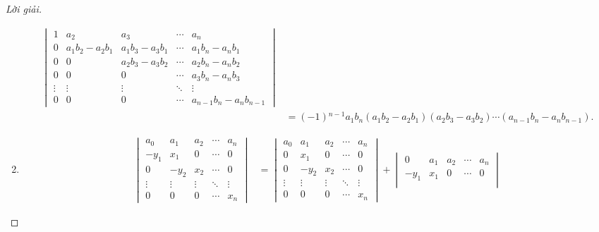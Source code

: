 \documentclass[class=nhvh-linear-algebra,crop=false]{standalone}
\begin{document}
\begin{proof}[Lời giải]
\begin{enumerate}[label = (\alph*)]
\begin{align*}
\begin{vmatrix}
				      1      & a_{2}                   & a_{3}                   & \cdots & a_{n}                       \\
				      0      & a_{1}b_{2} - a_{2}b_{1} & a_{1}b_{3} - a_{3}b_{1} & \cdots & a_{1}b_{n} - a_{n}b_{1}     \\
				      0      & 0                       & a_{2}b_{3} - a_{3}b_{2} & \cdots & a_{2}b_{n} - a_{n}b_{2}     \\
				      0      & 0                       & 0                       & \cdots & a_{3}b_{n} - a_{n}b_{3}     \\
				      \vdots & \vdots                  & \vdots                  & \ddots & \vdots                      \\
				      0      & 0                       & 0                       & \cdots & a_{n-1}b_{n} - a_{n}b_{n-1}
			      \end{vmatrix} \\
			       & =
			      (-1){}^{n-1}a_{1}b_{n}(a_{1}b_{2} - a_{2}b_{1})(a_{2}b_{3} - a_{3}b_{2})\cdots (a_{n-1}b_{n} - a_{n}b_{n-1}).
		      \end{align*}
		\item
		      \begin{align*}
			      \begin{vmatrix}
				      a_{0}  & a_{1}  & a_{2}  & \cdots & a_{n}  \\
				      -y_{1} & x_{1}  & 0      & \cdots & 0      \\
				      0      & -y_{2} & x_{2}  & \cdots & 0      \\
				      \vdots & \vdots & \vdots & \ddots & \vdots \\
				      0      & 0      & 0      & \cdots & x_{n}
			      \end{vmatrix}
			       & =
			      \begin{vmatrix}
				      a_{0}  & a_{1}  & a_{2}  & \cdots & a_{n}  \\
				      0      & x_{1}  & 0      & \cdots & 0      \\
				      0      & -y_{2} & x_{2}  & \cdots & 0      \\
				      \vdots & \vdots & \vdots & \ddots & \vdots \\
				      0      & 0      & 0      & \cdots & x_{n}
			      \end{vmatrix}
			      +
			      \begin{vmatrix}
				      0      & a_{1}  & a_{2}  & \cdots & a_{n}  \\
				      -y_{1} & x_{1}  & 0      & \cdots & 0      \\

\end{vmatrix}
\end{align*}
\end{enumerate}
\end{proof}
\end{document}
